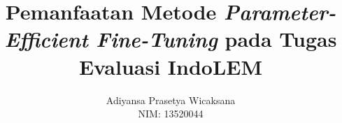 \documentclass[bahasa, 12pt, a4paper, onecolumn, oneside, final]{report}
\begin{document}
\title{Pemanfaatan Metode \textit{Parameter-Efficient Fine-Tuning} pada Tugas Evaluasi IndoLEM}
\author{
    Adiyansa Prasetya Wicaksana \\
    NIM: 13520044
}
\newcommand\titleen{Incorporating Parameter-Efficient Fine-Tuning into IndoLEM Evaluation Task}
\newcommand\tanggalpengesahan{16 Agustus 2024}
\newcommand{\PEFT}{\textit{parameter-efficient fine-tuning}\xspace}
\newcommand{\methodPEFT}{LoRA, \textit{Prefix-Tuning}, \textit{Adapter}, dan UniPELT\xspace}
\newcommand{\nlptask}{\textit{named entity recognition} (NER), \textit{sentiment analysis}, dan \textit{summarization}\xspace}





\pagestyle{plain}



\end{document}
